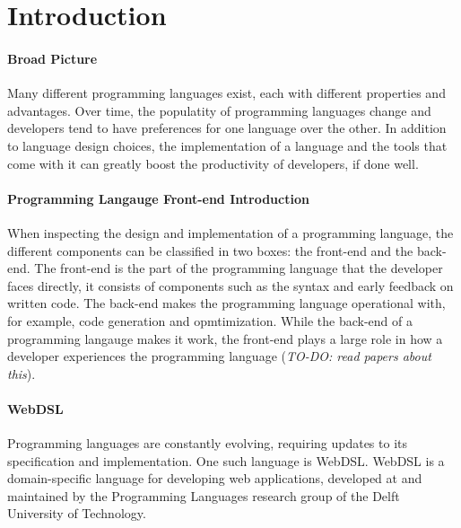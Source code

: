 
\chapter{\label{chap:introduction}Introduction}

  \subsubsection{Broad Picture}
  Many different programming languages exist, each with different properties and advantages. Over time, the populatity of programming languages change and developers tend to have preferences for one language over the other. In addition to language design choices, the implementation of a language and the tools that come with it can greatly boost the productivity of developers, if done well.

  \subsubsection{Programming Langauge Front-end Introduction}
  When inspecting the design and implementation of a programming language, the different components can be classified in two boxes: the front-end and the back-end. The front-end is the part of the programming language that the developer faces directly, it consists of components such as the syntax and early feedback on written code. The back-end makes the programming language operational with, for example, code generation and opmtimization. While the back-end of a programming langauge makes it work, the front-end plays a large role in how a developer experiences the programming language (\emph{TO-DO: read papers about this}).

  \subsubsection{WebDSL}
  Programming languages are constantly evolving, requiring updates to its specification and implementation. One such language is WebDSL. WebDSL is a domain-specific language for developing web applications, developed at and maintained by the Programming Languages research group of the Delft University of Technology.

